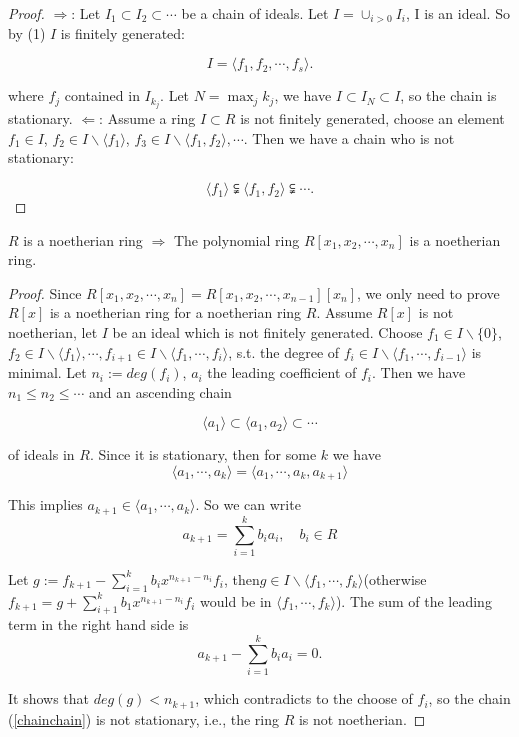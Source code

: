 \begin{proof}
	$ { \Rightarrow }$: Let $ { I_1\subset I_2\subset\cdots }$ be a chain of ideals. Let $ { I=\cup_{i>0} I_i }$, I is an ideal. So by (1) $ { I }$ is finitely generated:

	$$ I=\langle f_1, f_2, \cdots, f_s\rangle. $$

	where $ { f_j }$ contained in $ { I_{k_j} }$. Let $ { N = \max_{j}k_j }$, we have $ { I\subset I_N\subset I }$, so the chain is stationary.
	$ { \Leftarrow }$: Assume a ring $ { I\subset R }$ is not finitely generated, choose an element $ { f_1\in I }$, $ { f_2\in I\backslash\langle f_1\rangle }$, $ { f_3\in I\backslash \langle f_1, f_2 \rangle }, \cdots$. Then we have a chain who is not stationary:

	$$ \langle f_1\rangle \subsetneqq \langle f_1, f_2\rangle \subsetneqq \cdots .$$
\end{proof}

\begin{theorem}
	$ { R }$ is a noetherian ring $ { \Rightarrow }$ The polynomial ring $ { R[x_1, x_2, \cdots, x_n] }$ is a noetherian ring.
\end{theorem}

\begin{proof}
	Since $ R[x_1,x_2,\cdots,x_n] = R[x_1,x_2,\cdots,x_{n-1}][x_n] $, we only need to prove $ { R[x] }$ is a noetherian ring for a noetherian ring $ { R }$. Assume $ { R[x] }$ is not noetherian, let $ { I }$ be an ideal which is not finitely generated. Choose $  f_1\in I\backslash \{ 0\} $, $ f_2\in I\backslash \langle f_1\rangle  ,\cdots,  f_{i+1}\in I\backslash \langle f_1,\cdots,f_i\rangle $, s.t. the degree of $  f_i \in I\backslash \langle f_1,\cdots,f_{i-1}\rangle $ is minimal. Let $  n_i:= deg(f_i) $, $  a_i $ the leading coefficient of $  f_i $. Then we have $n_1\leq n_2\leq \cdots$ and an ascending chain

	\begin{equation}
		\langle a_1\rangle \subset \langle a_1, a_2 \rangle \subset \cdots\label{chainchain}
	\end{equation}

	of ideals in $ { R }$. Since it is stationary, then for some $ { k }$ we have
	$$ \langle a_1,\cdots,a_k\rangle = \langle a_1,\cdots,a_k,a_{k+1}\rangle $$

	This implies $ { a_{k+1}\in \langle a_1,\cdots,a_k\rangle }$. So we can write
	$$ a_{k+1}=\sum_{i=1}^{k} b_i a_i,\quad b_i\in R $$

	Let $ { g:=f_{k+1}-\sum_{i=1}^{k}b_ix^{n_{k+1}-n_i}f_i }$, then$ { g\in I\backslash \langle f_1,\cdots,f_k\rangle }$(otherwise $  f_{k+1}=g+\sum_{i+1}^{k}b_1x^{n_{k+1}-n_i}f_i $ would be in $ { \langle f_1,\cdots,f_k\rangle }$). The sum of the leading term in the right hand side is
	$$ a_{k+1}-\sum_{i=1}^{k}b_ia_i=0. $$

	It shows that $ { deg(g)<n_{k+1} }$, which contradicts to the choose of $ { f_i }$, so the chain (\ref{chainchain}) is not stationary, i.e., the ring $ { R }$ is not noetherian.
\end{proof}

